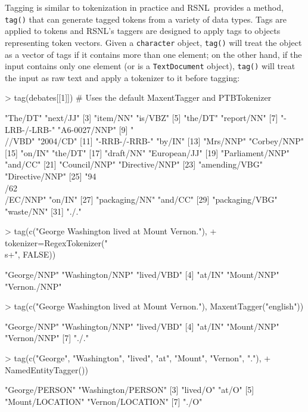 \documentclass[11pt]{article}
\def\RSNL{{\normalfont\fontseries{b}\selectfont RSNL}}
\let\code=\texttt
\let\rclass=\texttt
\begin{document}
Tagging is similar to tokenization in practice and \RSNL\ provides a
method, \code{tag()} that can generate tagged tokens from a variety of
data types.  Tags are applied to tokens and \RSNL's taggers are
designed to apply tags to objects representing token vectors.
Given a \rclass{character} object, \code{tag()} will treat the object
as a vector of tags if it contains more than one element; on the other
hand, if the input contains only one element (or is a
\rclass{TextDocument} object), \code{tag()} will treat the input as
raw text and apply a tokenizer to it before tagging:
\begin{Schunk}
\begin{Sinput}
> tag(debates[[1]]) # Uses the default MaxentTagger and PTBTokenizer
\end{Sinput}
\begin{Soutput}
 [1] "The/DT"           "next/JJ"         
 [3] "item/NN"          "is/VBZ"          
 [5] "the/DT"           "report/NN"       
 [7] "-LRB-/-LRB-"      "A6-0027/NNP"     
 [9] "\\//VBD"          "2004/CD"         
[11] "-RRB-/-RRB-"      "by/IN"           
[13] "Mrs/NNP"          "Corbey/NNP"      
[15] "on/IN"            "the/DT"          
[17] "draft/NN"         "European/JJ"     
[19] "Parliament/NNP"   "and/CC"          
[21] "Council/NNP"      "Directive/NNP"   
[23] "amending/VBG"     "Directive/NNP"   
[25] "94\\/62\\/EC/NNP" "on/IN"           
[27] "packaging/NN"     "and/CC"          
[29] "packaging/VBG"    "waste/NN"        
[31] "./."             
\end{Soutput}
\begin{Sinput}
> tag(c("George Washington lived at Mount Vernon."), 
+     tokenizer=RegexTokenizer("\\s+", FALSE))
\end{Sinput}
\begin{Soutput}
[1] "George/NNP"     "Washington/NNP" "lived/VBD"     
[4] "at/IN"          "Mount/NNP"      "Vernon./NNP"   
\end{Soutput}
\begin{Sinput}
> tag(c("George Washington lived at Mount Vernon."), MaxentTagger("english"))
\end{Sinput}
\begin{Soutput}
[1] "George/NNP"     "Washington/NNP" "lived/VBD"     
[4] "at/IN"          "Mount/NNP"      "Vernon/NNP"    
[7] "./."           
\end{Soutput}
\begin{Sinput}
> tag(c("George", "Washington", "lived", "at", "Mount", "Vernon", "."),
+       NamedEntityTagger())
\end{Sinput}
\begin{Soutput}
[1] "George/PERSON"     "Washington/PERSON"
[3] "lived/O"           "at/O"             
[5] "Mount/LOCATION"    "Vernon/LOCATION"  
[7] "./O"              
\end{Soutput}
\end{Schunk}
\end{document}
